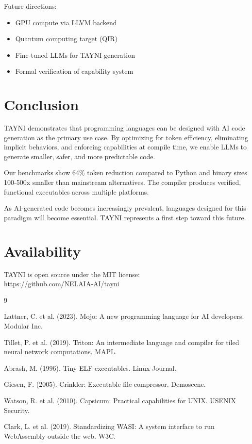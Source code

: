 \documentclass[11pt,a4paper]{article}
\begin{document}
Future directions:
\begin{itemize}
    \item GPU compute via LLVM backend
    \item Quantum computing target (QIR)
    \item Fine-tuned LLMs for TAYNI generation
    \item Formal verification of capability system
\end{itemize}

\section{Conclusion}

TAYNI demonstrates that programming languages can be designed with AI code generation as the primary use case. By optimizing for token efficiency, eliminating implicit behaviors, and enforcing capabilities at compile time, we enable LLMs to generate smaller, safer, and more predictable code.

Our benchmarks show 64\% token reduction compared to Python and binary sizes 100-500x smaller than mainstream alternatives. The compiler produces verified, functional executables across multiple platforms.

As AI-generated code becomes increasingly prevalent, languages designed for this paradigm will become essential. TAYNI represents a first step toward this future.

\section*{Availability}

TAYNI is open source under the MIT license:\\
\url{https://github.com/NELAIA-AI/tayni}


\begin{thebibliography}{9}

Lattner, C. et al. (2023). Mojo: A new programming language for AI developers. Modular Inc.

Tillet, P. et al. (2019). Triton: An intermediate language and compiler for tiled neural network computations. MAPL.

Abrash, M. (1996). Tiny ELF executables. Linux Journal.

Giesen, F. (2005). Crinkler: Executable file compressor. Demoscene.

Watson, R. et al. (2010). Capsicum: Practical capabilities for UNIX. USENIX Security.

Clark, L. et al. (2019). Standardizing WASI: A system interface to run WebAssembly outside the web. W3C.

\end{thebibliography}
\end{document}

